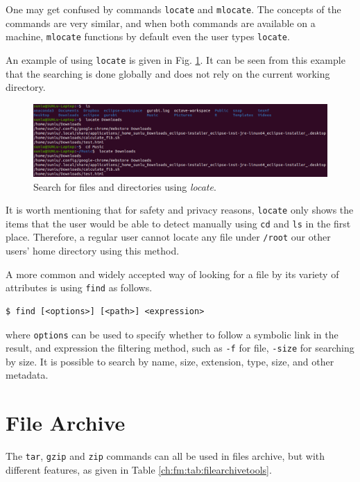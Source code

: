 One may get confused by commands \verb|locate| and \verb|mlocate|. The concepts of the commands are very similar, and when both commands are available on a machine, \verb|mlocate| functions by default even the user types \verb|locate|.

An example of using \verb|locate| is given in Fig. \ref{ch:fm:fig:locateexp}. It can be seen from this example that the searching is done globally and does not rely on the current working directory.
\begin{figure}
	\centering
	\includegraphics[width=350pt]{chapters/ch-file-management/figures/locateexp.png}
	\caption{Search for files and directories using \textit{locate}.} \label{ch:fm:fig:locateexp}
\end{figure}

It is worth mentioning that for safety and privacy reasons, \verb|locate| only shows the items that the user would be able to detect manually using \verb|cd| and \verb|ls| in the first place. Therefore, a regular user cannot locate any file under \verb|/root| our other users' home directory using this method.

A more common and widely accepted way of looking for a file by its variety of attributes is using \verb|find| as follows.
\begin{lstlisting}
$ find [<options>] [<path>] <expression>
\end{lstlisting}
where \verb|options| can be used to specify whether to follow a symbolic link in the result, and expression the filtering method, such as \verb|-f| for file, \verb|-size| for searching by size. It is possible to search by name, size, extension, type, size, and other metadata.

\section{File Archive}

The \verb|tar|, \verb|gzip| and \verb|zip| commands can all be used in files archive, but with different features, as given in Table \ref{ch:fm:tab:filearchivetools}.

